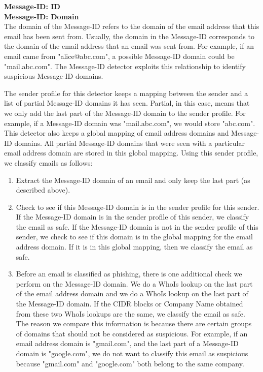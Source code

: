 \documentclass[letterpaper]{article}
\begin{document}
\textbf{Message-ID: ID}\\

\textbf{Message-ID: Domain}\\

The domain of the Message-ID refers to the domain of the email address that this email has been sent from. Usually, the domain in the Message-ID corresponds to the domain of the email address that an email was sent from. For example, if an email came from "alice@abc.com", a possible Message-ID domain could be "mail.abc.com". The Message-ID detector exploits this relationship to identify suspicious Message-ID domains.

The sender profile for this detector keeps a mapping between the sender and a list of partial Message-ID domains it has seen. Partial, in this case, means that we only add the last part of the Message-ID domain to the sender profile. For example, if a Message-ID domain was "mail.abc.com", we would store "abc.com". This detector also keeps a global mapping of email address domains and Message-ID domains. All partial Message-ID domains that were seen with a particular email address domain are stored in this global mapping. Using this sender profile, we classify emails as follows:\\

\begin{enumerate}
\item Extract the Message-ID domain of an email and only keep the last part (as described above).
\item Check to see if this Message-ID domain is in the sender profile for this sender. If the Message-ID domain is in the sender profile of this sender, we classify the email as safe. If the Message-ID domain is not in the sender profile of this sender, we check to see if this domain is in the global mapping for the email address domain. If it is in this global mapping, then we classify the email as safe.
\item Before an email is classified as phishing, there is one additional check we perform on the Message-ID domain. We do a WhoIs lookup on the last part of the email address domain and we do a WhoIs lookup on the last part of the Message-ID domain. If the CIDR blocks or Company Name obtained from these two WhoIs lookups are the same, we classify the email as safe. The reason we compare this information is because there are certain groups of domains that should not be considered as suspicious. For example, if an email address domain is "gmail.com", and the last part of a Message-ID domain is "google.com", we do not want to classify this email as suspicious because "gmail.com" and "google.com" both belong to the same company.
\end{enumerate}
\end{document}
